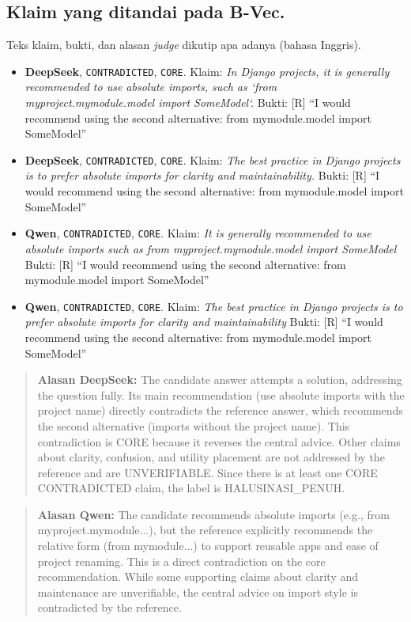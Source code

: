 \subsection{Klaim yang ditandai pada B-Vec.} Teks klaim, bukti, dan alasan \emph{judge} dikutip apa adanya (bahasa Inggris).
\begin{itemize}\small
\item \textbf{DeepSeek}, \texttt{CONTRADICTED}, \texttt{CORE}. Klaim: \emph{In Django projects, it is generally recommended to use absolute imports, such as `from myproject.mymodule.model import SomeModel`.} Bukti: [R] “I would recommend using the second alternative: from mymodule.model import SomeModel”
\item \textbf{DeepSeek}, \texttt{CONTRADICTED}, \texttt{CORE}. Klaim: \emph{The best practice in Django projects is to prefer absolute imports for clarity and maintainability.} Bukti: [R] “I would recommend using the second alternative: from mymodule.model import SomeModel”
\item \textbf{Qwen}, \texttt{CONTRADICTED}, \texttt{CORE}. Klaim: \emph{It is generally recommended to use absolute imports such as from myproject.mymodule.model import SomeModel} Bukti: [R] “I would recommend using the second alternative: from mymodule.model import SomeModel”
\item \textbf{Qwen}, \texttt{CONTRADICTED}, \texttt{CORE}. Klaim: \emph{The best practice in Django projects is to prefer absolute imports for clarity and maintainability} Bukti: [R] “I would recommend using the second alternative: from mymodule.model import SomeModel”
\end{itemize}
\begin{quote}\small\textbf{Alasan DeepSeek:} The candidate answer attempts a solution, addressing the question fully. Its main recommendation (use absolute imports with the project name) directly contradicts the reference answer, which recommends the second alternative (imports without the project name). This contradiction is CORE because it reverses the central advice. Other claims about clarity, confusion, and utility placement are not addressed by the reference and are UNVERIFIABLE. Since there is at least one CORE CONTRADICTED claim, the label is HALUSINASI\_PENUH.\end{quote}
\begin{quote}\small\textbf{Alasan Qwen:} The candidate recommends absolute imports (e.g., from myproject.mymodule...), but the reference explicitly recommends the relative form (from mymodule...) to support reusable apps and ease of project renaming. This is a direct contradiction on the core recommendation. While some supporting claims about clarity and maintenance are unverifiable, the central advice on import style is contradicted by the reference.\end{quote}
